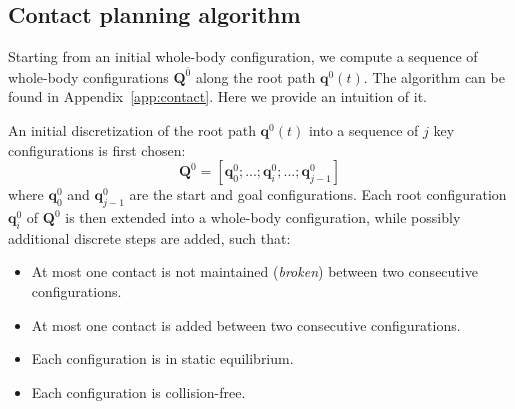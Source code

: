 \subsection{Contact planning algorithm}
Starting from an initial whole-body configuration, we compute a sequence
of whole-body configurations  $\mathbf{Q}^{\overline{0}}$ along the root path $\mathbf{q}^0(t)$.
The algorithm can be found in Appendix~\ref{app:contact}. Here we provide an intuition of it.

An initial discretization of the root path $\mathbf{q}^0(t)$ into a sequence of $j$ key configurations is first chosen:  
\begin{equation*}
	\mathbf{Q}^0 = [\mathbf{q}^0_{0}; ...; \mathbf{q}^0_{i}; ...; \mathbf{q}^0_{j-1}]
\end{equation*} 
where $\mathbf{q}^0_{0}$ and $\mathbf{q}^0_{j-1}$ are the start and goal configurations. %
Each root configuration $\mathbf{q}^0_i$ of $\mathbf{Q}^0$ is then extended into a whole-body configuration, while possibly additional discrete steps are added, such that:
\begin{itemize} 
\item At most one contact is not maintained (\textit{broken}) between two consecutive configurations.
\item At most one contact is added between two consecutive configurations.
\item Each configuration is in static equilibrium.
\item Each configuration is collision-free.
\end{itemize} 




